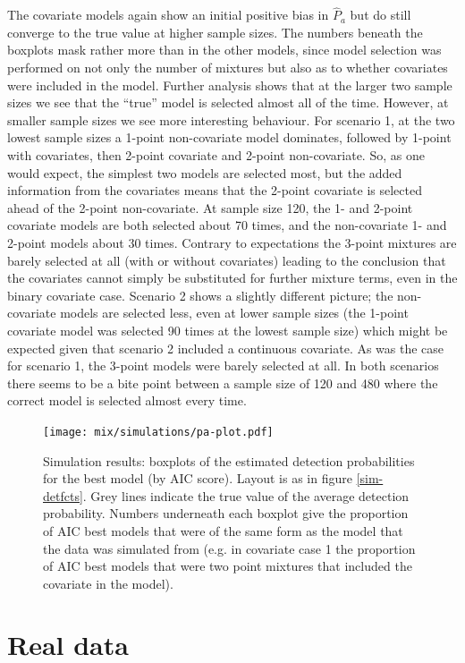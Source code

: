 The covariate models again show an initial positive bias in $\hat{P}_a$ but do still converge to the true value at higher sample sizes. The numbers beneath the boxplots mask rather more than in the other models, since model selection was performed on not only the number of mixtures but also as to whether covariates were included in the model. Further analysis shows that at the larger two sample sizes we see that the ``true'' model is selected almost all of the time. However,  at smaller sample sizes we see more interesting behaviour. For scenario 1, at the two lowest sample sizes a 1-point non-covariate model dominates, followed by 1-point with covariates, then 2-point covariate and 2-point non-covariate. So, as one would expect, the simplest two models are selected most, but the added information from the covariates means that the 2-point covariate is selected ahead of the 2-point non-covariate. At sample size 120, the 1- and 2-point covariate models are both selected about 70 times, and the non-covariate 1- and 2-point models about 30 times. Contrary to expectations the 3-point mixtures are barely selected at all (with or without covariates) leading to the conclusion that the covariates cannot simply be substituted for further mixture terms, even in the binary covariate case. Scenario 2 shows a slightly different picture; the non-covariate models are selected less, even at lower sample sizes (the 1-point covariate model was selected 90 times at\label{cor-e12} the lowest sample size) which might be expected given that scenario 2 included a continuous covariate. As was the case for scenario 1, the 3-point models were barely selected at all. In both scenarios there seems to be a bite point between a sample size of 120 and 480 where the correct model is selected almost every time.
	

\begin{figure}
\centering
\texttt{[image: mix/simulations/pa-plot.pdf]}
\caption{Simulation results: boxplots of the estimated detection probabilities for the best model (by AIC score). Layout is as in figure \ref{sim-detfcts}. Grey lines indicate the true value of the average detection probability. Numbers underneath each boxplot give the proportion of AIC best models that were of the same form as the model that the data was simulated from (e.g. in covariate case 1 the proportion of AIC best models that were two point mixtures that included the covariate in the model).}
\label{sim-boxplots}
\end{figure}


\section{Real data}
\label{s:data}

